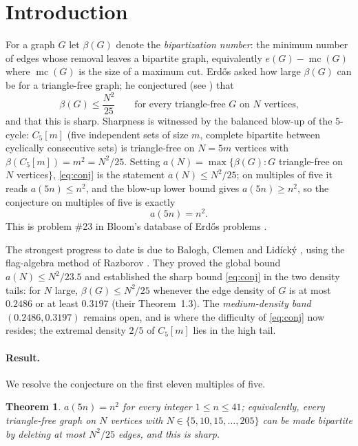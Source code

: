 \documentclass[11pt]{article}
\newtheorem{theorem}{Theorem}[section]
\theoremstyle{remark}
\DeclareMathOperator{\mc}{mc}
\newcommand{\bip}{\beta}
\begin{document}
\section{Introduction}

For a graph $G$ let $\bip(G)$ denote the \emph{bipartization number}: the minimum
number of edges whose removal leaves a bipartite graph, equivalently
$e(G)-\mc(G)$ where $\mc(G)$ is the size of a maximum cut. Erd\H{o}s asked how
large $\bip(G)$ can be for a triangle-free graph; he conjectured (see \cite{Bl23})
that
\begin{equation}\label{eq:conj}
\bip(G)\le \frac{N^2}{25}\qquad\text{for every triangle-free }G\text{ on }N\text{ vertices,}
\end{equation}
and that this is sharp. Sharpness is witnessed by the balanced blow-up of the
$5$-cycle: $C_5[m]$ (five independent sets of size $m$, complete bipartite between
cyclically consecutive sets) is triangle-free on $N=5m$ vertices with
$\bip(C_5[m])=m^2=N^2/25$. Setting $a(N)=\max\{\bip(G):G$ triangle-free on $N$
vertices$\}$, \eqref{eq:conj} is the statement $a(N)\le N^2/25$; on multiples of
five it reads $a(5n)\le n^2$, and the blow-up lower bound gives $a(5n)\ge n^2$, so
the conjecture on multiples of five is exactly
\[
a(5n)=n^2.
\]
This is problem \#23 in Bloom's database of Erd\H{o}s problems \cite{Bl23}.

The strongest progress to date is due to Balogh, Clemen and Lid\'ick\'y
\cite{BCL21}, using the flag-algebra method of Razborov \cite{Raz07}. They proved
the global bound $a(N)\le N^2/23.5$ and established the sharp bound \eqref{eq:conj}
in the two density tails: for $N$ large, $\bip(G)\le N^2/25$ whenever the edge
density of $G$ is at most $0.2486$ or at least $0.3197$ (their Theorem~1.3). The
\emph{medium-density band} $(0.2486,0.3197)$ remains open, and is where the
difficulty of \eqref{eq:conj} now resides; the extremal density $2/5$ of $C_5[m]$
lies in the high tail.

\paragraph{Result.} We resolve the conjecture on the first eleven multiples of five.

\begin{theorem}\label{thm:main}
$a(5n)=n^2$ for every integer $1\le n\le 41$; equivalently, every triangle-free
graph on $N$ vertices with $N\in\{5,10,15,\dots,205\}$ can be made bipartite by
deleting at most $N^2/25$ edges, and this is sharp.
\end{theorem}
\end{document}
